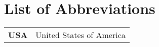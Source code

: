 \chapter*{List of Abbreviations}
\label{chap.glossary}

%
\begin{xtabular}{ll}
	\textbf{USA}		& United States of America
\end{xtabular}



